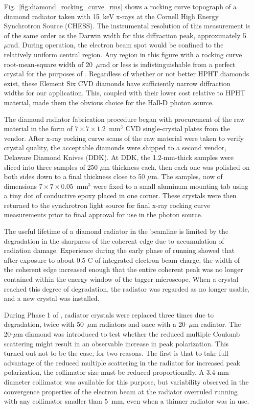 Fig.~\ref{fig:diamond_rocking_curve_rms} shows a rocking curve topograph of a diamond
radiator taken with 15~keV x-rays at the 
Cornell High Energy Synchrotron Source (CHESS). The instrumental
resolution of this measurement is of the same order as the Darwin width for this
diffraction peak, approximately 5 $\mu$rad. During operation, the electron beam spot would
be confined to the relatively uniform central region. Any region in
this figure with a rocking curve root-mean-square width of 20~$\mu$rad or less is indistinguishable
from a perfect crystal for the purposes of \GX{}.
Regardless of whether or not better HPHT diamonds exist, these Element Six CVD diamonds have sufficiently narrow  diffraction widths for our application.  This, coupled with their lower cost relative to HPHT material, made
them the obvious choice for the Hall-D photon source.

The diamond radiator fabrication procedure began with procurement of the raw
material in the form of $7\times 7\times 1.2$~mm$^3$ CVD single-crystal plates from the
vendor. After x-ray rocking curve scans of the raw material were taken to verify crystal
quality, the acceptable diamonds were shipped to a second vendor, Delaware Diamond Knives (DDK). At DDK, the
1.2-mm-thick samples were sliced into three samples of 250 $\mu$m thickness each, then
each one was polished on both sides down to a final thickness close to 50 $\mu$m. The
samples, now of dimensions $7\times 7\times 0.05$~mm$^3$ were fixed to a small aluminum
mounting tab using a tiny dot of conductive epoxy placed in one corner.
These crystals were then returned to the synchrotron light source
for final x-ray rocking curve measurements prior to final
approval for use in the \GX{} photon source.

The useful lifetime of a diamond radiator in the \GX{} beamline is limited by the 
degradation in the sharpness of the coherent edge due to accumulation of radiation damage.
Experience during the early phase of \GX{} running showed that after exposure to
about 0.5 C of integrated electron beam charge, the width of the coherent edge 
increased enough that the entire coherent peak was no longer contained within the energy
window of the tagger microscope. When a crystal reached this degree of degradation, the
radiator was regarded as no longer usable, and a new crystal was installed.

During Phase 1 of \GX{}, radiator crystals were replaced three times due
to degradation, twice with 50~$\mu$m radiators and once with a 20~$\mu$m radiator. The 20-$\mu$m
diamond was introduced to test whether the reduced multiple Coulomb scattering 
might result in an
observable increase in peak polarization. This turned out not to be the case, for
two reasons. The first is that to take full advantage of the reduced multiple
scattering in the radiator for increased peak polarization, the collimator size 
must be reduced proportionally. A 3.4-mm-diameter collimator was available for
this purpose, but variability observed in the convergence properties of the electron
beam at the radiator overruled running with any collimator smaller than 5~mm,
even when a thinner radiator was in use.


